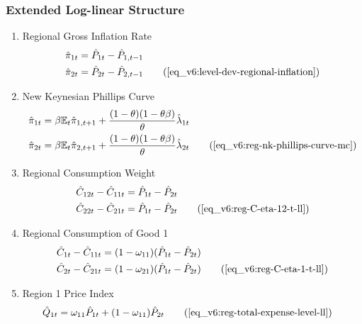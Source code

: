 \documentclass[../thesis.tex]{subfiles}
\begin{document}
{\singlespacing
	
\subsubsection{Extended Log-linear Structure}
	
\begin{enumerate}
	
	\item Regional Gross Inflation Rate
	\begin{align}
		\hat{\pi}_{1t} &= \hat{P}_{1t} - \hat{P}_{1, t-1} \nonumber \\
		\hat{\pi}_{2t} &= \hat{P}_{2t} - \hat{P}_{2, t-1} \tag{\ref{eq_v6:level-dev-regional-inflation}}
	\end{align}
	
	\item New Keynesian Phillips Curve
	\begin{align}
		\hat{\pi}_{1 t} &= \beta \E \hat{\pi}_{1, t+1} + \frac{(1-\theta) (1- \theta \beta)}{\theta} \hat{\lambda}_{1 t} \nonumber \\
		\hat{\pi}_{2 t} &= \beta \E \hat{\pi}_{2, t+1} + \frac{(1-\theta) (1- \theta \beta)}{\theta} \hat{\lambda}_{2 t} \tag{\ref{eq_v6:reg-nk-phillips-curve-mc}}
	\end{align}
	
	\item Regional Consumption Weight
	\begin{align}
		\hat{C}_{1 2t} - \hat{C}_{1 1t} &= \hat{P}_{1t} - \hat{P}_{2t} \nonumber \\
		\hat{C}_{2 2t} - \hat{C}_{2 1t} &= \hat{P}_{1t} - \hat{P}_{2t} \tag{\ref{eq_v6:reg-C-eta-12-t-ll}}
	\end{align}
	
	\item Regional Consumption of Good 1
	\begin{align}
		\hat{C}_{1 t} - \hat{C}_{1 1 t} &= (1 - \omega_{1 1}) (\hat{P}_{1t} - \hat{P}_{2t}) \nonumber \\
		\hat{C}_{2 t} - \hat{C}_{2 1 t} &= (1 - \omega_{2 1}) (\hat{P}_{1t} - \hat{P}_{2t}) \tag{\ref{eq_v6:reg-C-eta-1-t-ll}}
	\end{align}
	
	\item Region 1 Price Index
	\begin{align}
		\hat{Q}_{1t} &= \omega_{11} \hat{P}_{1 t} + (1 -\omega_{11}) \hat{P}_{2 t} \tag{\ref{eq_v6:reg-total-expense-level-ll}}
	\end{align}
	

\end{enumerate}}
\end{document}
